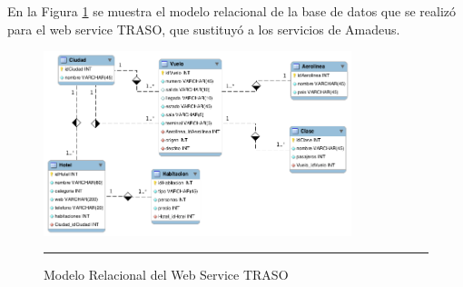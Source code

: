 En la Figura \ref{fig:relacionalTRASO} se muestra el modelo relacional de la base de datos que se realizó para el web service TRASO, que sustituyó a los servicios de Amadeus.

\begin{figure}[h!]
	\centering
		\includegraphics[width=0.8\textwidth]{Figuras/relacionalTRASO.png}
		\rule{30em}{0.5pt}
	\caption[Modelo Relacional del Web Service TRASO]{Modelo Relacional del Web Service TRASO}
	\label{fig:relacionalTRASO}
\end{figure}
\clearpage